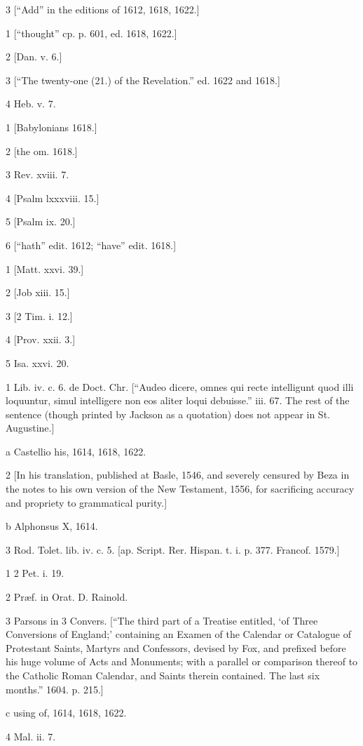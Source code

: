 3
[“Add” in the editions of 1612, 1618, 1622.]

1
[“thought” cp. p. 601, ed. 1618, 1622.]

2
[Dan. v. 6.]

3
[“The twenty-one (21.) of the Revelation.” ed. 1622 and 1618.]

4
Heb. v. 7.

1
[Babylonians 1618.]

2
[the om. 1618.]

3
Rev. xviii. 7.

4
[Psalm lxxxviii. 15.]

5
[Psalm ix. 20.]

6
[“hath” edit. 1612; “have” edit. 1618.]

1
[Matt. xxvi. 39.]

2
[Job xiii. 15.]

3
[2 Tim. i. 12.]

4
[Prov. xxii. 3.]

5
Isa. xxvi. 20.

1
Lib. iv. c. 6. de Doct. Chr. [“Audeo dicere, omnes qui recte intelligunt quod illi loquuntur, simul intelligere non eos aliter loqui debuisse.” iii. 67. The rest of the sentence (though printed by Jackson as a quotation) does not appear in St. Augustine.]

a
Castellio his, 1614, 1618, 1622.

2
[In his translation, published at Basle, 1546, and severely censured by Beza in the notes to his own version of the New Testament, 1556, for sacrificing accuracy and propriety to grammatical purity.]

b
Alphonsus X, 1614.

3
Rod. Tolet. lib. iv. c. 5. [ap. Script. Rer. Hispan. t. i. p. 377. Francof. 1579.]

1
2 Pet. i. 19.

2
Præf. in Orat. D. Rainold.

3
Parsons in 3 Convers. [“The third part of a Treatise entitled, ‘of Three Conversions of England;’ containing an Examen of the Calendar or Catalogue of Protestant Saints, Martyrs and Confessors, devised by Fox, and prefixed before his huge volume of Acts and Monuments; with a parallel or comparison thereof to the Catholic Roman Calendar, and Saints therein contained. The last six months.” 1604. p. 215.]

c
using of, 1614, 1618, 1622.

4
Mal. ii. 7.

